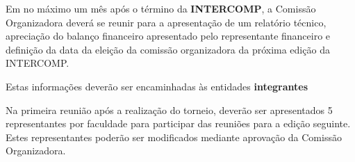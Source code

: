 \begin{article}
	Em no máximo um mês após o término da \textbf{INTERCOMP}, a Comissão Organizadora deverá se reunir para a apresentação de um relatório técnico, apreciação do balanço financeiro apresentado pelo representante financeiro e definição da data da eleição da comissão organizadora da próxima edição da INTERCOMP.

	\begin{xparagraph}
		Estas informações deverão ser encaminhadas às entidades \textbf{integrantes}
	\end{xparagraph}

	\begin{xparagraph}
		Na primeira reunião após a realização do torneio, deverão ser apresentados 5 representantes por faculdade para participar das reuniões para a edição seguinte. Estes representantes poderão ser modificados mediante aprovação da Comissão Organizadora.
	\end{xparagraph}
\end{article}
